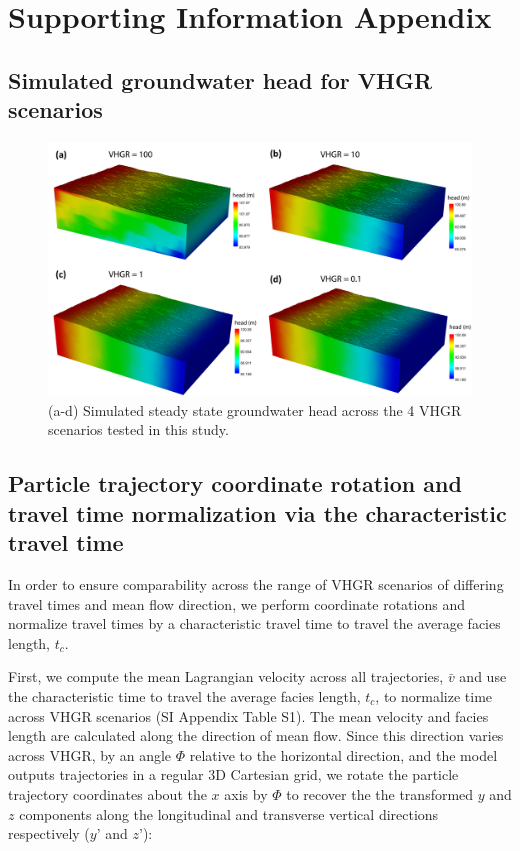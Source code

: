 \section{Supporting Information Appendix} \label{ap_c_vhgr}


\subsection{Simulated groundwater head for VHGR scenarios}

\begin{figure}[H]
\label{ap_c_heads}
  \includegraphics[width=\textwidth]{ch4_appendix_figs/heads.pdf}
  \caption{(a-d) Simulated steady state groundwater head across the 4 VHGR scenarios tested in this study.}
  \label{ap_c_heads_vhgr}
\end{figure}



\subsection{Particle trajectory coordinate rotation and travel time normalization via the characteristic travel time}
\label{s_ap_c_part_rot}

In order to ensure comparability across the range of VHGR scenarios of differing travel times and mean flow direction, we perform coordinate rotations and normalize travel times by a characteristic travel time to travel the average facies length, $t_c$. 

First, we compute the mean Lagrangian velocity across all trajectories, $\bar{v}$ and use the characteristic time to travel the average facies length, $t_c$, to normalize time across VHGR scenarios (SI Appendix Table S1). The mean velocity and facies length are calculated along the direction of mean flow. Since this direction varies across VHGR, by an angle $\Phi$ relative to the horizontal direction, and the model outputs trajectories in a regular 3D Cartesian grid, we rotate the particle trajectory coordinates about the $x$ axis by $\Phi$ to recover the the transformed $y$ and $z$ components along the longitudinal and transverse vertical directions respectively ($y’$ and $z’$):

